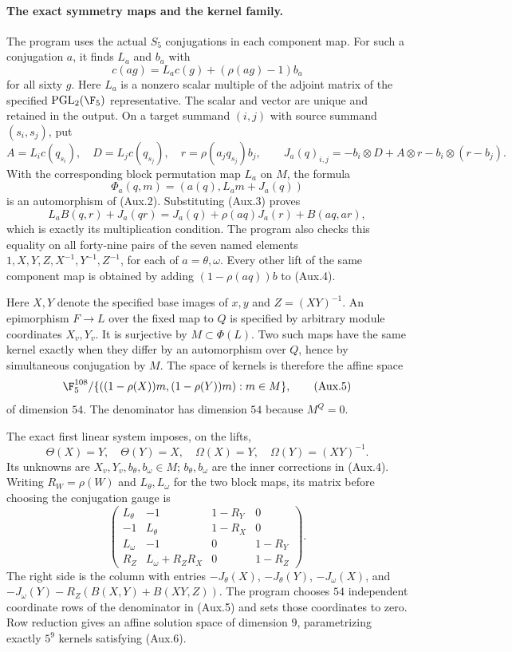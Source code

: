 \paragraph{The exact symmetry maps and the kernel family.}
The program uses the actual $S_5$ conjugations in each component
map.  For such a conjugation $a$, it finds $L_a$ and $b_a$ with
\[
 c(a g)=L_a c(g)+(\rho(a g)-1)b_a                       \tag{Aux.3}
\]
for all sixty $g$.  Here $L_a$ is a nonzero scalar multiple of
the adjoint matrix of the specified $\operatorname{PGL}_2(\F_5)$
representative.  The scalar and vector are unique and retained
in the output.  On a target summand $(i,j)$ with source summand
$(s_i,s_j)$, put
\[
 A=L_i c(q_{s_i}),\quad D=L_j c(q_{s_j}),\quad
 r=\rho(a_jq_{s_j})b_j,
 \qquad
 J_a(q)_{i,j}=-b_i\otimes D+A\otimes r-b_i\otimes(r-b_j).
\]
With the corresponding block permutation map $L_a$ on $M$,
the formula
\[
 \Phi_a(q,m)=(a(q),L_a m+J_a(q))                         \tag{Aux.4}
\]
is an automorphism of (Aux.2).  Substituting (Aux.3) proves
\[
 L_a B(q,r)+J_a(qr)=J_a(q)+\rho(aq)J_a(r)+B(aq,ar),
\]
which is exactly its multiplication condition.  The program
also checks this equality on all forty-nine pairs of the seven
named elements $1,X,Y,Z,X^{-1},Y^{-1},Z^{-1}$, for each of
$a=\theta,\omega$.  Every other lift of the same component map
is obtained by adding $(1-\rho(aq))b$ to (Aux.4).

Here $X,Y$ denote the specified base images of $x,y$ and
$Z=(XY)^{-1}$.  An epimorphism $F\to L$ over the fixed map to
$Q$ is specified by arbitrary module coordinates $X_v,Y_v$.
It is surjective by $M\subset\Phi(L)$.
Two such maps have the same kernel exactly when they differ
by an automorphism over $Q$, hence by simultaneous conjugation
by $M$.  The space of kernels is therefore the affine space
\[
 \F_5^{108}/
   \{((1-\rho(X))m,(1-\rho(Y))m):m\in M\},
                                                        \tag{Aux.5}
\]
of dimension $54$.  The denominator has dimension $54$
because $M^Q=0$.

The exact first linear system imposes, on the lifts,
\[
 \Theta(X)=Y,\quad\Theta(Y)=X,\quad
 \Omega(X)=Y,\quad\Omega(Y)=(XY)^{-1}.                  \tag{Aux.6}
\]
Its unknowns are $X_v,Y_v,b_\theta,b_\omega\in M$;
$b_\theta,b_\omega$ are the inner corrections in (Aux.4).
Writing $R_W=\rho(W)$ and $L_\theta,L_\omega$ for the
two block maps, its matrix before choosing the conjugation
gauge is
\[
 \begin{pmatrix}
 L_\theta&-1&1-R_Y&0\\
 -1&L_\theta&1-R_X&0\\
 L_\omega&-1&0&1-R_Y\\
 R_Z&L_\omega+R_ZR_X&0&1-R_Z
 \end{pmatrix}.                                        \tag{Aux.7}
\]
The right side is the column with entries
$-J_\theta(X)$, $-J_\theta(Y)$, $-J_\omega(X)$, and
$-J_\omega(Y)-R_Z(B(X,Y)+B(XY,Z))$.
The program chooses $54$ independent coordinate rows of
the denominator in (Aux.5) and sets those coordinates to zero.
Row reduction gives an affine solution space of dimension
$9$, parametrizing exactly $5^9$ kernels satisfying (Aux.6).

